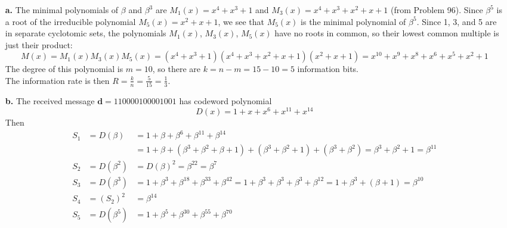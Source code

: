 \documentclass[11pt]{article}
\renewcommand{\vec}[1]{\mathbf{#1}}
\begin{document}
\medskip
{}
\begin{itemize}
  \item[{\bf a.}] The minimal polynomials of $\beta$ and $\beta^3$ are
                  $M_1(x) = x^4 + x^3 + 1$ and $M_3(x) = x^4 + x^3 + x^2 + x + 1$ (from Problem 96).
                  Since $\beta^5$ is a root of the irreducible polynomial $M_5(x) = x^2 + x + 1$,
                  we see that $M_5(x)$ is the minimal polynomial of $\beta^5$.
                  Since 1, 3, and 5 are in separate cyclotomic sets,
                  the polynomials $M_1(x)$, $M_3(x)$, $M_5(x)$ have no roots in common,
                  so their lowest common multiple is just their product:
                  \[
                    M(x) = M_1(x)M_3(x)M_5(x)
                         = (x^4 + x^3 + 1)(x^4 + x^3 + x^2 + x + 1)(x^2 + x + 1)
                         = x^{10} + x^9 + x^8 + x^6 + x^5 + x^2 + 1
                  \]
                  The degree of this polynomial is $m = 10$,
                  so there are $k = n - m = 15 - 10 = 5$ information bits.\\
                  The information rate is then $R = \frac{k}{n} = \frac{5}{15} = \frac{1}{3}$.
  \item[{\bf b.}] The received message    $\vec{d} = \text{110000100001001}$
                  has codeword polynomial
                  \[
                     D(x) = 1 + x + x^6 + x^{11} + x^{14}
                  \]
                  Then
                  \[
                    \begin{array}{lll}
                      S_1 &= D(\beta)  &= 1 + \beta + \beta^6 + \beta^{11} + \beta^{14}\\
                          &            &= 1 + \beta + (\beta^3+\beta^2+\beta+1) + (\beta^3+\beta^2+1) + (\beta^3 + \beta^2)
                                        = \beta^3 + \beta^2 + 1 = \beta^{11} \\
                      S_2 &= D(\beta^2)&= D(\beta)^2 = \beta^{22} = \beta^7\\
                      S_3 &= D(\beta^3)&= 1 + \beta^3 + \beta^{18} + \beta^{33} + \beta^{42}
                                        = 1 + \beta^3 + \beta^3 + \beta^3 + \beta^{12}
                                        = 1 + \beta^3 + (\beta + 1)
                                        = \beta^{10}\\
                      S_4 &= (S_2)^2   &= \beta^{14}\\
                      S_5 &= D(\beta^5)&= 1 + \beta^5 + \beta^{30} + \beta^{55} + \beta^{70}

\end{array}\]
\end{itemize}
\end{document}
